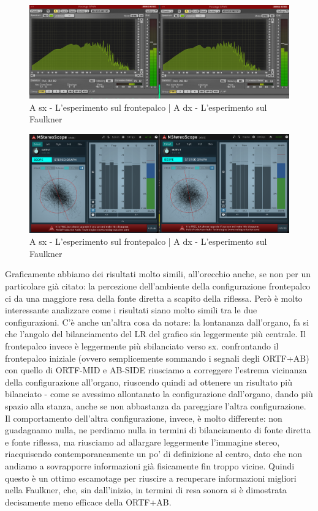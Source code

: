 \documentclass{article}
\begin{document}
    \begin{figure}[H]
        \centering
        \includegraphics[width=1\textwidth]{images/6PLOT-MID-SIDE.png}
         \caption{\label{fig11}A sx - L'esperimento sul frontepalco | A dx - L'esperimento sul Faulkner}
    \end{figure}
    
    \begin{figure}[H]
        \centering
        \includegraphics[width=1\textwidth]{images/6PLOT-MID-SIDE-STEREO.png}
         \caption{\label{fig11}A sx - L'esperimento sul frontepalco | A dx - L'esperimento sul Faulkner}
    \end{figure}
    
    Graficamente abbiamo dei risultati molto simili, all'orecchio anche, se non per un particolare già citato: la percezione dell'ambiente della configurazione frontepalco ci da una maggiore resa della fonte diretta a scapito della riflessa. Però è molto interessante analizzare come i risultati siano molto simili tra le due configurazioni. C'è anche un'altra cosa da notare: la lontananza dall'organo, fa si che l'angolo del bilanciamento del LR del grafico sia leggermente più centrale. Il frontepalco invece è leggermente più sbilanciato verso sx.
    confrontando il frontepalco iniziale (ovvero semplicemente sommando i segnali degli ORTF+AB) con quello di ORTF-MID e AB-SIDE riusciamo a correggere l'estrema vicinanza della configurazione all'organo, riuscendo quindi ad ottenere un risultato più bilanciato - come se avessimo allontanato la configurazione dall'organo, dando più spazio alla stanza, anche se non abbastanza da pareggiare l'altra configurazione.
    Il comportamento dell'altra configurazione, invece, è molto differente: non guadagnamo nulla, ne perdiamo nulla in termini di bilanciamento di fonte diretta e fonte riflessa, ma riusciamo ad allargare leggermente l'immagine stereo, riacquisendo contemporaneamente un po' di definizione al centro, dato che non andiamo a sovrapporre informazioni già fisicamente fin troppo vicine. Quindi questo è un ottimo escamotage per riuscire a recuperare informazioni migliori nella Faulkner, che, sin dall'inizio, in termini di resa sonora si è dimostrata decisamente meno efficace della ORTF+AB.
    
\end{document}
